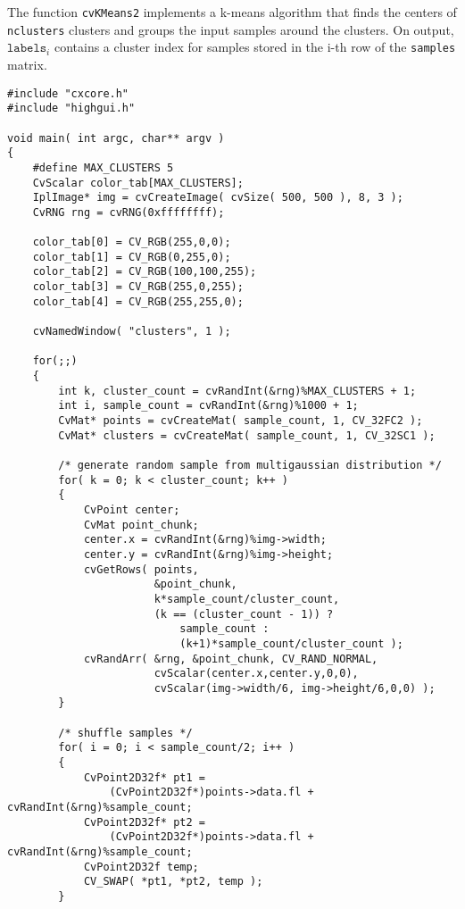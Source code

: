 The function \texttt{cvKMeans2} implements a k-means algorithm that finds the
centers of \texttt{nclusters} clusters and groups the input samples
around the clusters. On output, $\texttt{labels}_i$ contains a cluster index for
samples stored in the i-th row of the \texttt{samples} matrix.

\ifC
{}
\begin{lstlisting}
#include "cxcore.h"
#include "highgui.h"

void main( int argc, char** argv )
{
    #define MAX_CLUSTERS 5
    CvScalar color_tab[MAX_CLUSTERS];
    IplImage* img = cvCreateImage( cvSize( 500, 500 ), 8, 3 );
    CvRNG rng = cvRNG(0xffffffff);

    color_tab[0] = CV_RGB(255,0,0);
    color_tab[1] = CV_RGB(0,255,0);
    color_tab[2] = CV_RGB(100,100,255);
    color_tab[3] = CV_RGB(255,0,255);
    color_tab[4] = CV_RGB(255,255,0);

    cvNamedWindow( "clusters", 1 );

    for(;;)
    {
        int k, cluster_count = cvRandInt(&rng)%MAX_CLUSTERS + 1;
        int i, sample_count = cvRandInt(&rng)%1000 + 1;
        CvMat* points = cvCreateMat( sample_count, 1, CV_32FC2 );
        CvMat* clusters = cvCreateMat( sample_count, 1, CV_32SC1 );

        /* generate random sample from multigaussian distribution */
        for( k = 0; k < cluster_count; k++ )
        {
            CvPoint center;
            CvMat point_chunk;
            center.x = cvRandInt(&rng)%img->width;
            center.y = cvRandInt(&rng)%img->height;
            cvGetRows( points,
                       &point_chunk,
                       k*sample_count/cluster_count,
                       (k == (cluster_count - 1)) ?
                           sample_count :
                           (k+1)*sample_count/cluster_count );
            cvRandArr( &rng, &point_chunk, CV_RAND_NORMAL,
                       cvScalar(center.x,center.y,0,0),
                       cvScalar(img->width/6, img->height/6,0,0) );
        }

        /* shuffle samples */
        for( i = 0; i < sample_count/2; i++ )
        {
            CvPoint2D32f* pt1 =
                (CvPoint2D32f*)points->data.fl + cvRandInt(&rng)%sample_count;
            CvPoint2D32f* pt2 =
                (CvPoint2D32f*)points->data.fl + cvRandInt(&rng)%sample_count;
            CvPoint2D32f temp;
            CV_SWAP( *pt1, *pt2, temp );
        }


\end{lstlisting}

